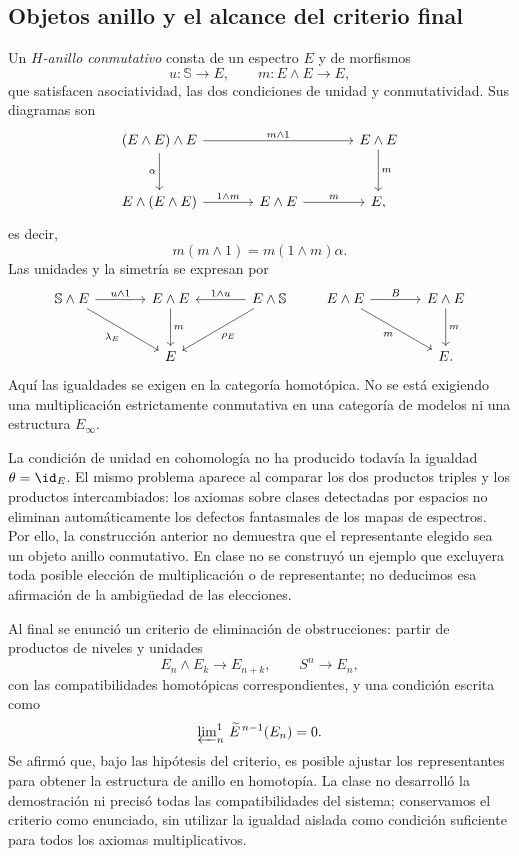 \subsection{Objetos anillo y el alcance del criterio final}
Un \emph{$H$-anillo conmutativo} consta de un espectro $E$ y de morfismos
\[
u\colon\mathbb S\longrightarrow E,
\qquad m\colon E\wedge E\longrightarrow E,
\]
que satisfacen asociatividad, las dos condiciones de unidad y conmutatividad. Sus diagramas son
\[
\begin{tikzcd}[column sep=large,row sep=large]
(E\wedge E)\wedge E\arrow[rr,"m\wedge1"]\arrow[d,"\alpha"']&&E\wedge E\arrow[d,"m"]\\
E\wedge(E\wedge E)\arrow[r,"1\wedge m"]&E\wedge E\arrow[r,"m"]&E,
\end{tikzcd}
\]
es decir,
\[
m(m\wedge1)=m(1\wedge m)\alpha.
\]
Las unidades y la simetría se expresan por
\[
\begin{tikzcd}[column sep=large,row sep=large]
\mathbb S\wedge E\arrow[r,"u\wedge1"]\arrow[dr,"\lambda_E"']&E\wedge E\arrow[d,"m"]&
E\wedge\mathbb S\arrow[l,"1\wedge u"']\arrow[dl,"\rho_E"]\\
&E&
\end{tikzcd}
\qquad
\begin{tikzcd}[column sep=large,row sep=large]
E\wedge E\arrow[r,"B"]\arrow[dr,"m"']&E\wedge E\arrow[d,"m"]\\
&E.
\end{tikzcd}
\]
Aquí las igualdades se exigen en la categoría homotópica. No se está exigiendo una multiplicación estrictamente conmutativa en una categoría de modelos ni una estructura $E_\infty$.

La condición de unidad en cohomología no ha producido todavía la igualdad $\theta=\id_E$. El mismo problema aparece al comparar los dos productos triples y los productos intercambiados: los axiomas sobre clases detectadas por espacios no eliminan automáticamente los defectos fantasmales de los mapas de espectros. Por ello, la construcción anterior no demuestra que el representante elegido sea un objeto anillo conmutativo. En clase no se construyó un ejemplo que excluyera toda posible elección de multiplicación o de representante; no deducimos esa afirmación de la ambigüedad de las elecciones.

Al final se enunció un criterio de eliminación de obstrucciones: partir de productos de niveles y unidades
\[
E_n\wedge E_k\longrightarrow E_{n+k},
\qquad S^n\longrightarrow E_n,
\]
con las compatibilidades homotópicas correspondientes, y una condición escrita como
\[
\varprojlim\nolimits_n^{1}\,\widetilde E^{\,n-1}(E_n)=0.
\]
Se afirmó que, bajo las hipótesis del criterio, es posible ajustar los representantes para obtener la estructura de anillo en homotopía. La clase no desarrolló la demostración ni precisó todas las compatibilidades del sistema; conservamos el criterio como enunciado, sin utilizar la igualdad aislada como condición suficiente para todos los axiomas multiplicativos.

